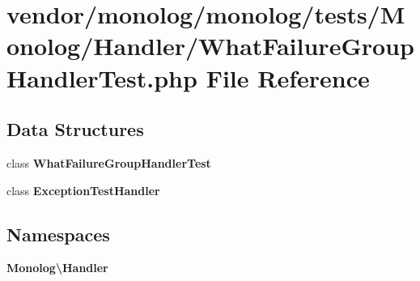 \section{vendor/monolog/monolog/tests/\+Monolog/\+Handler/\+What\+Failure\+Group\+Handler\+Test.php File Reference}
\label{_what_failure_group_handler_test_8php}
\subsection*{Data Structures}
\begin{DoxyCompactItemize}
\item 
class {\bf What\+Failure\+Group\+Handler\+Test}
\item 
class {\bf Exception\+Test\+Handler}
\end{DoxyCompactItemize}
\subsection*{Namespaces}
\begin{DoxyCompactItemize}
\item 
 {\bf Monolog\textbackslash{}\+Handler}
\end{DoxyCompactItemize}
